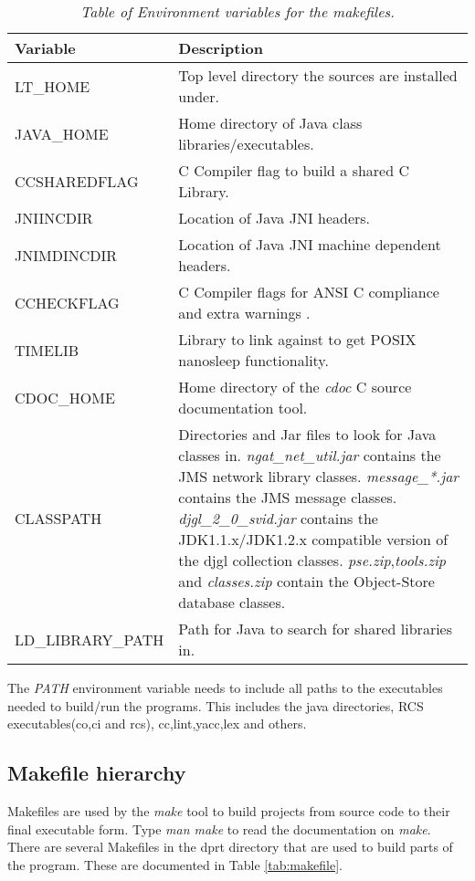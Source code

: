 \documentclass[10pt,a4paper]{article}
\begin{document}
\begin{table}[!h]
\begin{center}
\begin{footnotesize}
\begin{tabular}{|l|p{40em}|} \hline
{\bf Variable} 	& {\bf Description} \\ \hline
LT\_HOME	& Top level directory the sources are installed under. \\ \hline
JAVA\_HOME	& Home directory of Java class libraries/executables. \\ \hline
CCSHAREDFLAG	& C Compiler flag to build a shared C Library. \\ \hline
JNIINCDIR	& Location of Java JNI headers. \\ \hline
JNIMDINCDIR	& Location of Java JNI machine dependent headers. \\ \hline
CCHECKFLAG	& C Compiler flags for ANSI C compliance and extra warnings \footnotemark. \\ \hline
TIMELIB		& Library to link against to get POSIX nanosleep functionality. \\ \hline
CDOC\_HOME	& Home directory of the {\em cdoc} C source documentation tool. \\ \hline
CLASSPATH	& Directories and Jar files to look for Java classes in. 
{\em ngat\_net\_util.jar} contains the JMS network library classes. 
{\em message\_*.jar} contains the JMS message classes. 
{\em djgl\_2\_0\_svid.jar} contains the JDK1.1.x/JDK1.2.x compatible version of the djgl collection classes. 
{\em pse.zip},{\em tools.zip} and {\em classes.zip} contain the Object-Store database classes.  \\ \hline
LD\_LIBRARY\_PATH & Path for Java to search for shared libraries in.  \\ \hline
\end{tabular}
\end{footnotesize}
\end{center}
\caption{\em Table of Environment variables for the makefiles.}
\label{tab:makeenv} 
\end{table}

The {\em PATH} environment variable needs to include all paths to the executables needed to build/run the 
programs. This includes the java directories, RCS executables(co,ci and rcs), cc,lint,yacc,lex and others.

\subsection{Makefile hierarchy}
Makefiles are used by the {\em make} tool to build projects from source code to their final executable form.
Type {\em man make} to read the documentation on {\em make}.
There are several Makefiles in the dprt directory that are used to build parts of the program. These
are documented in Table \ref{tab:makefile}.
\end{document}
